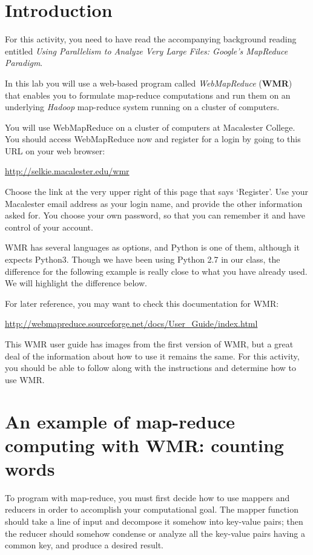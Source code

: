 \documentclass[letterpaper,10pt,openany,oneside]{sphinxmanual}
\begin{document}
\section{Introduction}
\label{wmr_py/wmr_py:introduction}
For this activity, you need to have read the accompanying
background reading entitled
\emph{Using Parallelism to Analyze Very Large Files: Google's MapReduce Paradigm}.

In this lab you will use a web-based program called \emph{WebMapReduce}
(\textbf{WMR}) that enables you to formulate map-reduce computations and
run them on an underlying \emph{Hadoop} map-reduce system running on a
cluster of computers.

You will use WebMapReduce on a cluster of computers at Macalester
College. You should access WebMapReduce now and register for a
login by going to this URL on your web browser:

\href{http://selkie.macalester.edu/wmr}{http://selkie.macalester.edu/wmr}

Choose the link at the very upper right of this page that says
`Register'. Use your Macalester email address as your login name,
and provide the other information asked for. You choose your own
password, so that you can remember it and have control of your
account.

WMR has several languages as options, and Python is one of them,
although it expects Python3. Though we have been using Python 2.7
in our class, the difference for the following example is really
close to what you have already used. We will highlight the
difference below.

For later reference, you may want to check this documentation for
WMR:

\href{http://webmapreduce.sourceforge.net/docs/User\_Guide/index.html}{http://webmapreduce.sourceforge.net/docs/User\_Guide/index.html}

This WMR user guide has images from the first version of WMR, but a
great deal of the information about how to use it remains the same.
For this activity, you should be able to follow along with the
instructions and determine how to use WMR.


\section{An example of map-reduce computing with WMR: counting words}
\label{wmr_py/wmr_py:an-example-of-map-reduce-computing-with-wmr-counting-words}
To program with map-reduce, you must first decide how to use
mappers and reducers in order to accomplish your computational
goal. The mapper function should take a line of input and decompose
it somehow into key-value pairs; then the reducer should somehow
condense or analyze all the key-value pairs having a common key,
and produce a desired result.
\end{document}
